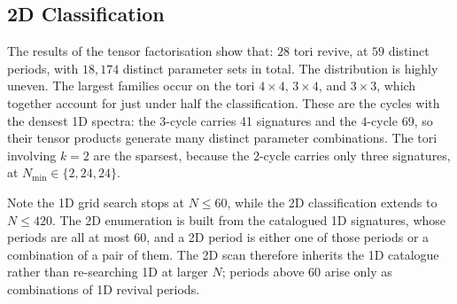 \subsection{2D Classification}
The results of the tensor factorisation show that:
$28$ tori revive, at $59$ distinct
periods, with $18{,}174$ distinct parameter sets in total.
The distribution is highly uneven. The largest families
occur on the tori $4 \times 4$, $3 \times 4$, and
$3 \times 3$, which together account for just under half the
classification. These are the cycles with the densest 1D
spectra: the $3$-cycle carries 41 signatures and the
$4$-cycle 69, so their tensor products
generate many distinct parameter combinations. The tori
involving $k = 2$ are the sparsest, because the $2$-cycle
carries only three signatures, at $N_{\min} \in \{2, 24, 24\}$.

Note the 1D grid search stops at $N \le 60$, while the 2D
classification extends to $N \le 420$. 
The 2D enumeration is built from the catalogued 1D
signatures, whose periods are all at most $60$, and a 2D period is
either one of those periods or a combination of a pair of them.
The 2D scan therefore inherits the 1D catalogue rather than
re-searching 1D at larger $N$; periods above $60$ arise only as
combinations of 1D revival periods.

